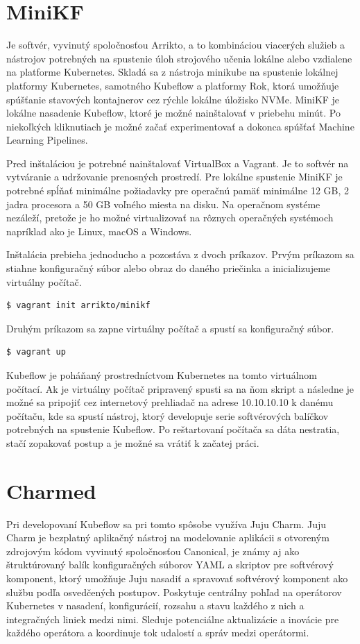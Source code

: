 \section{MiniKF}

Je softvér, vyvinutý spoločnosťou Arrikto, a to kombináciou viacerých služieb a nástrojov potrebných na spustenie úloh strojového učenia lokálne alebo vzdialene na platforme Kubernetes. Skladá sa z nástroja minikube na spustenie lokálnej platformy Kubernetes, samotného Kubeflow a platformy Rok, ktorá umožňuje spúšťanie stavových kontajnerov cez rýchle lokálne úložisko NVMe. MiniKF je lokálne nasadenie Kubeflow, ktoré je možné nainštalovať v priebehu minút. Po niekoľkých kliknutiach je možné začať experimentovať a dokonca spúšťať Machine Learning Pipelines.

Pred inštaláciou je potrebné nainštalovať VirtualBox a Vagrant. Je to softvér na vytváranie a udržovanie prenosných prostredí. Pre lokálne spustenie MiniKF je potrebné spĺňať minimálne požiadavky pre operačnú pamäť minimálne 12 GB, 2 jadra procesora a 50 GB voľného miesta na disku. Na operačnom systéme nezáleží, pretože je ho možné virtualizovať na rôznych operačných systémoch napríklad ako je Linux, macOS a Windows.

Inštalácia prebieha jednoducho a pozostáva z dvoch príkazov. Prvým príkazom sa stiahne konfiguračný súbor alebo obraz do daného priečinka a inicializujeme virtuálny počítač.
\begin{lstlisting}[language=Bash]
    $ vagrant init arrikto/minikf
    \end{lstlisting}
Druhým príkazom sa zapne virtuálny počítač a spustí sa konfiguračný súbor.
\begin{lstlisting}[language=Bash]
    $ vagrant up
    \end{lstlisting}
Kubeflow je poháňaný prostredníctvom Kubernetes na tomto virtuálnom počítací. Ak je virtuálny počítač pripravený spusti sa na ňom skript a následne je možné sa pripojiť cez internetový prehliadač na adrese 10.10.10.10 k danému počítaču, kde sa spustí nástroj, ktorý developuje serie softvérových balíčkov potrebných na spustenie Kubeflow. Po reštartovaní počítača sa dáta nestratia, stačí zopakovať postup a je možné sa vrátiť k začatej práci.

\section{Charmed}

Pri developovaní Kubeflow sa pri tomto spôsobe využíva Juju Charm. Juju Charm je bezplatný aplikačný nástroj na modelovanie aplikácii s otvoreným zdrojovým kódom vyvinutý spoločnosťou Canonical, je známy aj ako štruktúrovaný balík konfiguračných súborov YAML a skriptov pre softvérový komponent, ktorý umožňuje Juju nasadiť a spravovať softvérový komponent ako službu podľa osvedčených postupov. Poskytuje centrálny pohľad na operátorov Kubernetes v nasadení, konfigurácií, rozsahu a stavu každého z nich a integračných liniek medzi nimi. Sleduje potenciálne aktualizácie a inovácie pre každého operátora a koordinuje tok udalostí a správ medzi operátormi.

